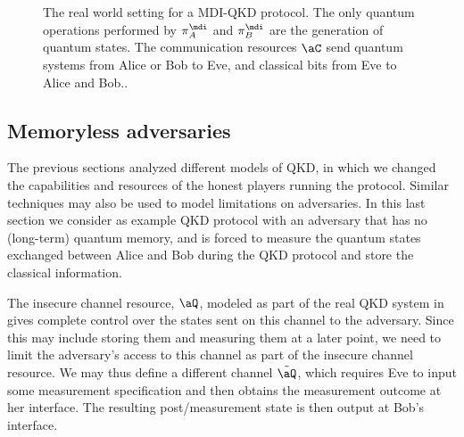 \begin{figure}[tb]


\caption[MDI-QKD]{\label{fig:alternatives.mdi}The real world setting
  for a MDI-QKD protocol. The only quantum operations performed by
  $\pi^{\mdi}_A$ and $\pi^{\mdi}_B$ are the generation of quantum
  states. The communication resources $\aC$ send quantum systems from
  Alice or Bob to Eve, and classical bits from Eve to Alice and Bob..}
\end{figure}

\subsection{Memoryless adversaries}
\label{sec:alternative.memoryless}

The previous sections analyzed different models of QKD, in which we
changed the capabilities and resources of the honest players running
the protocol. Similar techniques may also be used to model
limitations on adversaries. In this last section we consider as example QKD
protocol with an adversary that has no (long-term) quantum memory, and is
forced to measure the quantum states exchanged between Alice and Bob
during the QKD protocol and store the classical information.

The insecure channel resource, $\aQ$, modeled as part of the real QKD
system in  gives complete control over the
states sent on this channel to the adversary. Since this may include
storing them and measuring them at a later point, we need to limit the
adversary's access to this channel as part of the insecure channel
resource. We may thus define a different channel $\tilde{\aQ}$, which
requires Eve to input some measurement specification and then obtains
the measurement outcome at her interface. The resulting
post\-/measurement state is then output at Bob's interface.

